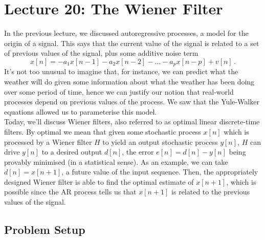 \section{Lecture 20: The Wiener Filter}
%
In the previous lecture, we discussed autoregressive processes,
a model for the origin of a signal. This says that the current
value of the signal is related to a set of previous values of
the signal, plus some additive noise term
%
\begin{displaymath}
  x[n] = -a_1x[n-1] - a_2x[n-2] - \hdots - a_px[n-p] + v[n] \,.
\end{displaymath}
%
It's not too unusual to imagine that, for instance, we can
predict what the weather will do given some information about
what the weather has been doing over some period of time, hence
we can justify our notion that real-world processes depend on
previous values of the process. We saw that the Yule-Walker
equations allowed us to parameterise this model.\\
%
Today, we'll discuss Wiener filters, also referred to as
optimal linear discrete-time filters. By optimal we mean that
given some stochastic process $x[n]$ which is processed by
a Wiener filter $H$ to yield an output stochastic process $y[n]$,
$H$ can drive $y[n]$ to a desired output $d[n]$, the error
$e[n] = d[n] - y[n]$ being provably minimised (in a statistical
sense). As an example, we can take $d[n] = x[n+1]$, a future value
of the input sequence. Then, the appropriately designed Wiener
filter is able to find the optimal estimate of $x[n+1]$, which is
possible since the AR process tells us that $x[n+1]$ is related
to the previous values of the signal.

\subsection{Problem Setup}
